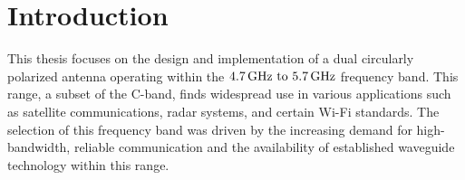 \documentclass[11pt,a4paper,twoside,openany]{report}
\begin{document}

\begin{titlepage}
    
\end{titlepage}

\newpage\blankpage











\tableofcontents

\listoffigures

\chapter*{Introduction}
\label{chapter:introduction}

This thesis focuses on the design and implementation of a dual circularly polarized antenna operating within the $\frequencyrange$ frequency band. This range, a subset of the C-band, finds widespread use in various applications such as satellite communications, radar systems, and certain Wi-Fi standards. The selection of this frequency band was driven by the increasing demand for high-bandwidth, reliable communication and the availability of established waveguide technology within this range.
\end{document}
